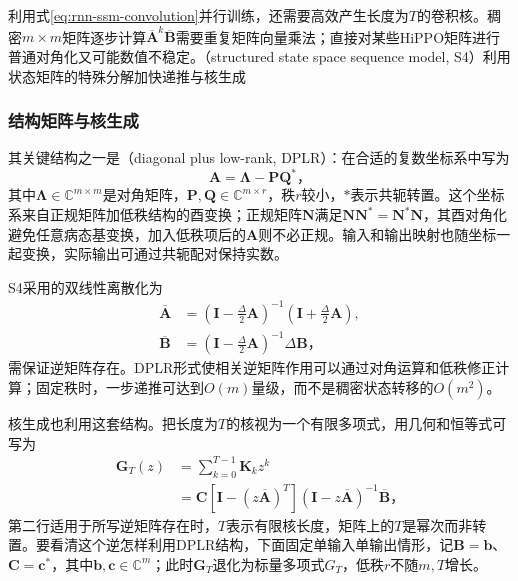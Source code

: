 利用式\eqref{eq:rnn-ssm-convolution}并行训练，还需要高效产生长度为$T$的卷积核。稠密$m\times m$矩阵逐步计算$\overline{\bm{A}}^k\overline{\bm{B}}$需要重复矩阵向量乘法；直接对某些HiPPO矩阵进行普通对角化又可能数值不稳定。（structured state space sequence model, S4）利用状态矩阵的特殊分解加快递推与核生成

\subsubsection{结构矩阵与核生成}
\label{sec:rnn-s4-structure}

其关键结构之一是（diagonal plus low-rank, DPLR）：在合适的复数坐标系中写为
\begin{equation}
  \bm{A}=\bm{\Lambda}-\bm{P}\bm{Q}^{*}\text{，}
  \label{eq:rnn-s4-dplr}
\end{equation}
其中$\bm{\Lambda}\in\mathbb{C}^{m\times m}$是对角矩阵，$\bm{P},\bm{Q}\in\mathbb{C}^{m\times r}$，秩$r$较小，$*$表示共轭转置。这个坐标系来自正规矩阵加低秩结构的酉变换；正规矩阵$\bm{N}$满足$\bm{N}\bm{N}^{*}=\bm{N}^{*}\bm{N}$，其酉对角化避免任意病态基变换，加入低秩项后的$\bm{A}$则不必正规。输入和输出映射也随坐标一起变换，实际输出可通过共轭配对保持实数。

S4采用的双线性离散化为
\begin{equation}
  \begin{aligned}
    \overline{\bm{A}}&=
      (\bm{I}-\tfrac{\Delta}{2}\bm{A})^{-1}
      (\bm{I}+\tfrac{\Delta}{2}\bm{A}),\\
    \overline{\bm{B}}&=
      (\bm{I}-\tfrac{\Delta}{2}\bm{A})^{-1}\Delta\bm{B}\text{，}
  \end{aligned}
  \label{eq:rnn-s4-bilinear}
\end{equation}
需保证逆矩阵存在。DPLR形式使相关逆矩阵作用可以通过对角运算和低秩修正计算；固定秩时，一步递推可达到$O(m)$量级，而不是稠密状态转移的$O(m^2)$。

核生成也利用这套结构。把长度为$T$的核视为一个有限多项式，用几何和恒等式可写为
\begin{equation}
  \begin{aligned}
    \bm{G}_T(z)&=\sum_{k=0}^{T-1}\bm{K}_k z^k\\
      &=\bm{C}\left[\bm{I}-(z\overline{\bm{A}})^T\right]
         (\bm{I}-z\overline{\bm{A}})^{-1}\overline{\bm{B}}\text{，}
  \end{aligned}
  \label{eq:rnn-s4-generating-function}
\end{equation}
第二行适用于所写逆矩阵存在时，$T$表示有限核长度，矩阵上的$T$是幂次而非转置。要看清这个逆怎样利用DPLR结构，下面固定单输入单输出情形，记$\bm B=\bm b$、$\bm C=\bm c^*$，其中$\bm b,\bm c\in\mathbb C^m$；此时$\bm G_T$退化为标量多项式$G_T$，低秩$r$不随$m,T$增长。

